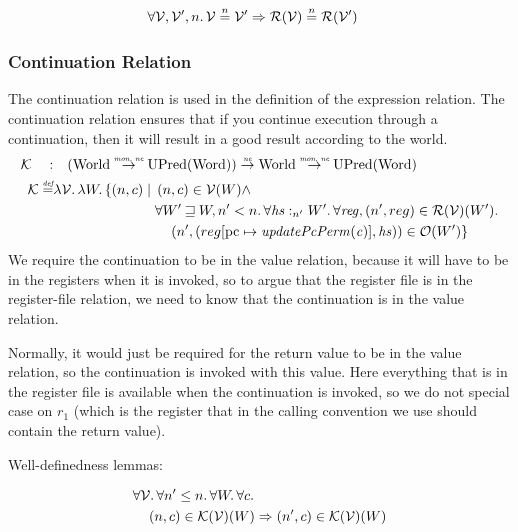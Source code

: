 \documentclass{article}
\newcommand{\update}[2]{[#1 \mapsto #2]}
\newcommand{\monnefun}{\stackrel{\textit{\tiny{mon, ne}}}{\rightarrow}}
\newcommand{\nefun}{\stackrel{\textit{\tiny{ne}}}{\rightarrow}}
\newcommand{\defeq}{\stackrel{\textit{\tiny{def}}}{=}}
\newcommand{\nequal}[1][n]{\stackrel{\tiny{#1}}{=}}
\newcommand{\var}[1]{\mathit{#1}}
\newcommand{\hs}{\var{hs}}
\newcommand{\pcreg}{\mathrm{pc}}
\newcommand{\reg}{\var{reg}}
\newcommand{\heap}{\var{heap}}
\newcommand{\plainfun}[2]{
  \ifthenelse{\equal{#2}{}}
             {\mathit{#1}}
             {\mathit{#1}(#2)}
}
\newcommand{\updatePcPerm}[1]{\plainfun{updatePcPerm}{#1}}
\newcommand{\future}{\mathbin{\sqsupseteq}}
\newcommand{\heapSat}[3][\heap]{#1 :_{#2} #3}
\newcommand{\asmType}{\plaindom{AsmType}}
\newcommand{\plaindom}[1]{\mathrm{#1}}
\newcommand{\Words}{\plaindom{Word}}
\newcommand{\Worlds}{\plaindom{World}}
\newcommand{\UPred}[1]{\plaindom{UPred}(#1)}
\newcommand{\intr}[2]{\mathcal{#1}}
\newcommand{\valueintr}[1]{\intr{V}{#1}}
\newcommand{\contintr}[1]{\intr{K}{#1}}
\newcommand{\regintr}[1]{\intr{R}{#1}}
\newcommand{\stdvr}{\valueintr{\asmType}}
\newcommand{\stdrr}{\regintr{\asmType}}
\newcommand{\stdkr}{\contintr{\asmType}}
\newcommand{\observations}{\mathcal{O}}
\newcommand{\npair}[2][n]{\left(#1,#2 \right)}
\begin{document}
\begin{lemma}
\label{lem:reg-ne-vr}
\begin{align*}
  &\forall \stdvr, \stdvr', n \ldotp \stdvr \nequal \stdvr' \Rightarrow \stdrr(\stdvr) \nequal \stdrr(\stdvr')
\end{align*}
\end{lemma}

\subsubsection{Continuation Relation}
\label{subsubsec:continuation-relation}
The continuation relation is used in the definition of the expression relation. The continuation relation ensures that if you continue execution through a continuation, then it will result in a good result according to the world.
\begin{align*}
  \stdkr \quad : & \quad (\Worlds \monnefun \UPred{\Words}) \nefun \Worlds \monnefun \UPred{\Words} \\
  \stdkr \defeq & \lambda \stdvr \ldotp \lambda W \ldotp\{ \npair{c} \mid
                     \begin{aligned}[t]
                       & \npair{c} \in \stdvr(W) \land \\
                       &  \forall W' \future W, n' < n\ldotp %
                       \forall \heapSat[\hs]{n'}{W'} \ldotp \forall \reg, \npair[n']{reg} \in \stdrr(\stdvr)(W') \ldotp \\
                       & \quad \npair[n']{(reg\update{\pcreg}{\updatePcPerm{\var{c}}},\hs)} \in \observations(W') \}
                 \end{aligned}
\end{align*}
We require the continuation to be in the value relation, because it will have to be in the registers when it is invoked, so to argue that the register file is in the register-file relation, we need to know that the continuation is in the value relation.

Normally, it would just be required for the return value to be in the value relation, so the continuation is invoked with this value. Here everything that is in the register file is available when the continuation is invoked, so we do not special case on $r_1$ (which is the register that in the calling convention we use should contain the return value). 


Well-definedness lemmas:
\begin{lemma}
\label{lem:stdkr-dc}
  \begin{align*}
    &\forall \stdvr \ldotp \forall n' \leq n \ldotp \forall W \ldotp \forall c \ldotp\\
    &\quad \npair{c} \in \stdkr(\stdvr)(W) \Rightarrow \npair[n']{c} \in \stdkr(\stdvr)(W)
  \end{align*}
\end{lemma}
\end{document}
